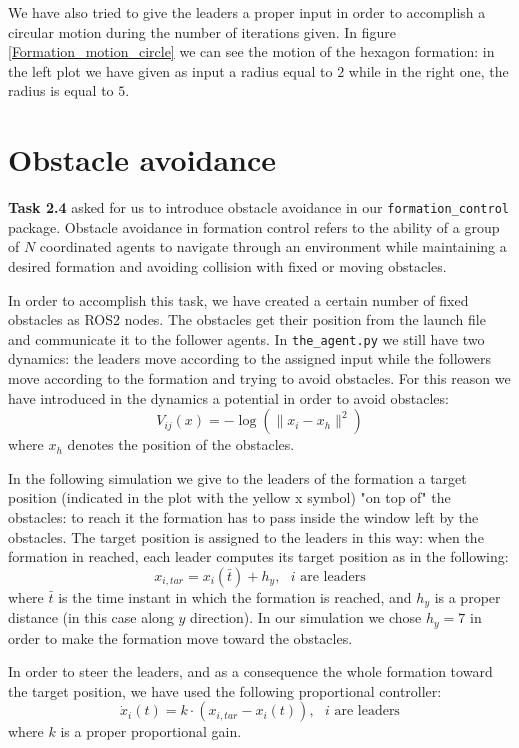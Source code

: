 \documentclass[a4paper,11pt,oneside]{book}
\begin{document}
\bigskip
We have also tried to give the leaders a proper input in order to accomplish a circular motion during the number of iterations given. In figure \ref{Formation_motion_circle} we can see the motion of the hexagon formation: in the left plot we have given as input a radius equal to $2$ while in the right one, the radius is equal to $5$.



\section{Obstacle avoidance}
\textbf{Task 2.4} asked for us to introduce obstacle avoidance in our \texttt{formation\_control} package. Obstacle avoidance in formation control refers to the ability of a group of $N$ coordinated agents to navigate through an environment while maintaining a desired formation and avoiding collision with fixed or moving obstacles. 

In order to accomplish this task, we have created a certain number of fixed obstacles as ROS2 nodes. The obstacles get their position from the launch file and communicate it to the follower agents. 
In \texttt{the\_agent.py} we still have two dynamics: the leaders move according to the assigned input while the followers move according to the formation and trying to avoid obstacles. For this reason we have introduced in the dynamics a potential in order to avoid obstacles:
\begin{equation}
V_{ij}(x) = - \log( \lVert x_i - x_h\rVert ^2)
\label{Obstacles_barrier}
\end{equation}
where $x_h$ denotes the position of the obstacles.

\bigskip
In the following simulation we give to the leaders of the formation a target position (indicated in the plot with the yellow x symbol) "on top of" the obstacles: to reach it the formation has to pass inside the window left by the obstacles. 
The target position is assigned to the leaders in this way: when the formation in reached, each leader computes its target position as in the following:
\begin{equation}
x_{i,tar} = x_i(\bar{t}) + h_y, \text{     $i$ are leaders}
\end{equation}
where $\bar{t}$ is the time instant in which the formation is reached, and $h_y$ is a proper distance (in this case along $y$ direction). In our simulation we chose $h_y = 7$ in order to make the formation move toward the obstacles.

\bigskip
In order to steer the leaders, and as a consequence the whole formation toward the target position, we have used the following proportional controller:
\begin{equation}
\dot{x}_i(t) = k\cdot (x_{i,tar} - x_i(t)), \text{     $i$ are leaders}
\end{equation}
where $k$ is a proper proportional gain.
\end{document}
